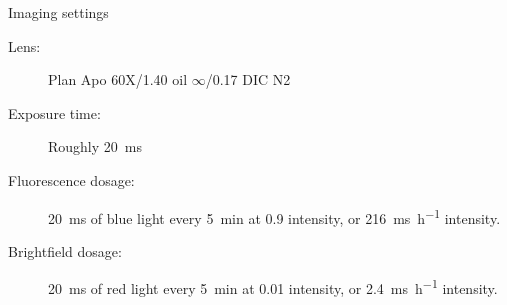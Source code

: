 \documentclass{article}
\begin{document}
Imaging settings
\begin{description}
	\item[Lens:] Plan Apo 60X/1.40 oil $\infty$/0.17 DIC N2
	\item[Exposure time:] Roughly \SI{20}{\milli\second}
	\item[Fluorescence dosage:] \SI{20}{\milli\second} of blue light every \SI{5}{\minute} at 0.9 intensity, or \SI{216}{\milli\second\per\hour} intensity.
	\item[Brightfield dosage:] \SI{20}{\milli\second} of red light every \SI{5}{\minute} at 0.01 intensity, or \SI{2.4}{\milli\second\per\hour} intensity.
\end{description}
\end{document}
